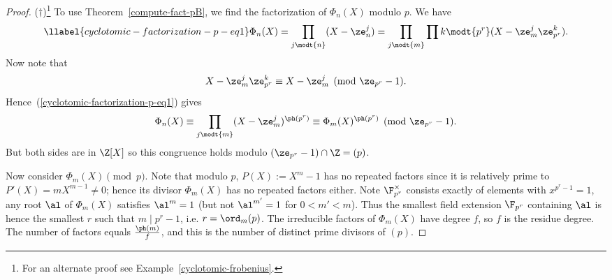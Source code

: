 \begin{proof}($\dagger$)\footnote{For an alternate proof see Example~\ref{cyclotomic-frobenius}.} 
To use Theorem~\ref{compute-fact-pB}, we find the factorization of $\Phi_n(X)$ modulo $p$. We have
\begin{equation}\llabel{cyclotomic-factorization-p-eq1}
\Phi_n(X)=\prod_{j\modt{n}}(X-\ze_n^j)
=\prod_{j\modt{m}}\prod{k\modt{p^r}} (X-\ze_m^j\ze_{p^r}^k).
\end{equation}
Now note that
\[
X-\ze_m^j\ze_{p^r}^k\equiv X-\ze_m^j\pmod{\ze_{p^r}-1}.
\]
Hence~(\ref{cyclotomic-factorization-p-eq1}) gives
\[
\Phi_n(X)\equiv \prod_{j\modt{m}} (X-\ze_m^j)^{\ph(p^r)}
\equiv \Phi_m(X)^{\ph(p^r)}\pmod{\ze_{p^r}-1}.
\]
But both sides are in $\Z[X]$ so this congruence holds modulo $(\ze_{p^r}-1)\cap \Z=(p)$.

Now consider $\Phi_m(X)\pmod{p}$. Note that modulo $p$, $P(X):=X^m-1$ has no repeated factors since it is relatively prime to  $P'(X)=mX^{m-1}\ne 0$; hence its divisor $\Phi_m(X)$ has no repeated factors either. Note $\F_{p^r}^{\times}$ consists exactly of elements with $x^{p^r-1}=1$, any root $\al$ of $\Phi_m(X)$ satisfies $\al^m=1$ (but not $\al^{m'}=1$ for $0<m'<m$). Thus the smallest field extension $\F_{p^r}$ containing $\al$ is hence the smallest $r$ such that $m\mid p^r-1$, i.e. $r=\ord_m(p)$. The irreducible factors of $\Phi_m(X)$ have degree $f$, so $f$ is the residue degree. The number of factors equals $\frac{\ph(m)}{f}$, and this is the number of distinct prime divisors of $(p)$.
\end{proof}
